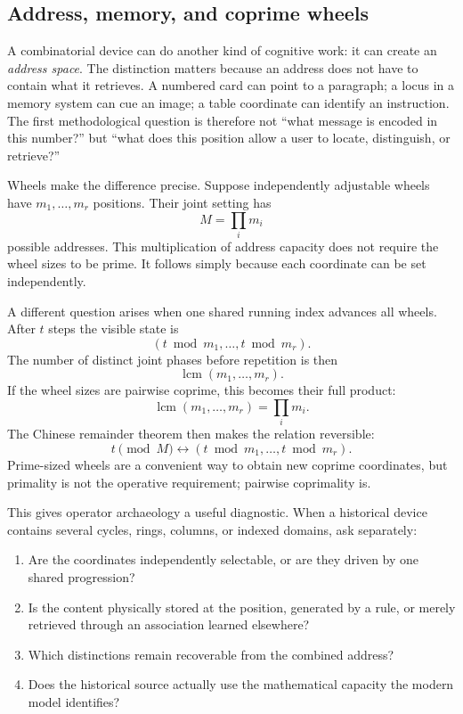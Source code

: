 \documentclass[11pt]{article}
\begin{document}
\subsection{Address, memory, and coprime wheels}

A combinatorial device can do another kind of cognitive work: it can create an
\emph{address space}. The distinction matters because an address does not have
to contain what it retrieves. A numbered card can point to a paragraph; a
locus in a memory system can cue an image; a table coordinate can identify an
instruction. The first methodological question is therefore not ``what message
is encoded in this number?'' but ``what does this position allow a user to
locate, distinguish, or retrieve?''

Wheels make the difference precise. Suppose independently adjustable wheels
have \(m_1,\ldots,m_r\) positions. Their joint setting has
\[
M=\prod_i m_i
\]
possible addresses. This multiplication of address capacity does not require
the wheel sizes to be prime. It follows simply because each coordinate can be
set independently.

A different question arises when one shared running index advances all wheels.
After \(t\) steps the visible state is
\[
(t\bmod m_1,\ldots,t\bmod m_r).
\]
The number of distinct joint phases before repetition is then
\[
\operatorname{lcm}(m_1,\ldots,m_r).
\]
If the wheel sizes are pairwise coprime, this becomes their full product:
\[
\operatorname{lcm}(m_1,\ldots,m_r)=\prod_i m_i.
\]
The Chinese remainder theorem then makes the relation reversible:
\[
t\pmod M
\longleftrightarrow
(t\bmod m_1,\ldots,t\bmod m_r).
\]
Prime-sized wheels are a convenient way to obtain new coprime coordinates,
but primality is not the operative requirement; pairwise coprimality is.

This gives operator archaeology a useful diagnostic. When a historical device
contains several cycles, rings, columns, or indexed domains, ask separately:

\begin{enumerate}
\item Are the coordinates independently selectable, or are they driven by one
shared progression?
\item Is the content physically stored at the position, generated by a rule,
or merely retrieved through an association learned elsewhere?
\item Which distinctions remain recoverable from the combined address?
\item Does the historical source actually use the mathematical capacity the
modern model identifies?
\end{enumerate}
\end{document}
